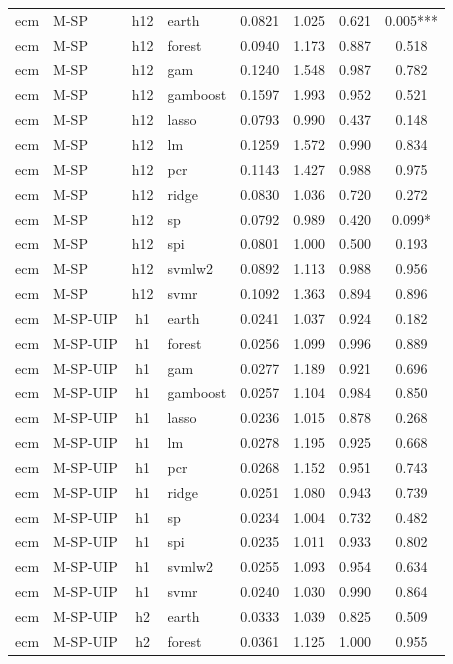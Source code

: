 \begin{ThreePartTable}
\begin{longtable}[t]{llclcccc}
\addlinespace
ecm & M-SP & h12 & earth & 0.0821 & 1.025 & 0.621 & 0.005***\\
ecm & M-SP & h12 & forest & 0.0940 & 1.173 & 0.887 & 0.518\\
ecm & M-SP & h12 & gam & 0.1240 & 1.548 & 0.987 & 0.782\\
ecm & M-SP & h12 & gamboost & 0.1597 & 1.993 & 0.952 & 0.521\\
ecm & M-SP & h12 & lasso & 0.0793 & 0.990 & 0.437 & 0.148\\
ecm & M-SP & h12 & lm & 0.1259 & 1.572 & 0.990 & 0.834\\
ecm & M-SP & h12 & pcr & 0.1143 & 1.427 & 0.988 & 0.975\\
ecm & M-SP & h12 & ridge & 0.0830 & 1.036 & 0.720 & 0.272\\
ecm & M-SP & h12 & sp & 0.0792 & 0.989 & 0.420 & 0.099*\\
ecm & M-SP & h12 & spi & 0.0801 & 1.000 & 0.500 & 0.193\\
ecm & M-SP & h12 & svmlw2 & 0.0892 & 1.113 & 0.988 & 0.956\\
ecm & M-SP & h12 & svmr & 0.1092 & 1.363 & 0.894 & 0.896\\
\addlinespace
ecm & M-SP-UIP & h1 & earth & 0.0241 & 1.037 & 0.924 & 0.182\\
ecm & M-SP-UIP & h1 & forest & 0.0256 & 1.099 & 0.996 & 0.889\\
ecm & M-SP-UIP & h1 & gam & 0.0277 & 1.189 & 0.921 & 0.696\\
ecm & M-SP-UIP & h1 & gamboost & 0.0257 & 1.104 & 0.984 & 0.850\\
ecm & M-SP-UIP & h1 & lasso & 0.0236 & 1.015 & 0.878 & 0.268\\
ecm & M-SP-UIP & h1 & lm & 0.0278 & 1.195 & 0.925 & 0.668\\
ecm & M-SP-UIP & h1 & pcr & 0.0268 & 1.152 & 0.951 & 0.743\\
ecm & M-SP-UIP & h1 & ridge & 0.0251 & 1.080 & 0.943 & 0.739\\
ecm & M-SP-UIP & h1 & sp & 0.0234 & 1.004 & 0.732 & 0.482\\
ecm & M-SP-UIP & h1 & spi & 0.0235 & 1.011 & 0.933 & 0.802\\
ecm & M-SP-UIP & h1 & svmlw2 & 0.0255 & 1.093 & 0.954 & 0.634\\
ecm & M-SP-UIP & h1 & svmr & 0.0240 & 1.030 & 0.990 & 0.864\\
\addlinespace
ecm & M-SP-UIP & h2 & earth & 0.0333 & 1.039 & 0.825 & 0.509\\
ecm & M-SP-UIP & h2 & forest & 0.0361 & 1.125 & 1.000 & 0.955\\

\end{longtable}
\end{ThreePartTable}

